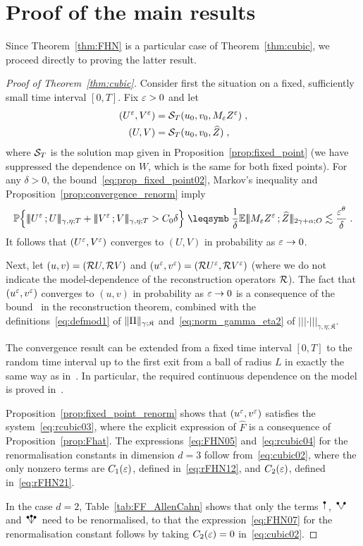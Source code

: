 \documentclass[reqno,11pt]{article}
\def\normDgamma#1{|\!|\!|#1|\!|\!|}
\def\seminormff#1#2{|\!|\!|#1\,\mathord{;}\,#2|\!|\!|}
\def\fraK{\mathfrak{K}}
\def\Zhat{\widehat Z}
\begin{document}

\section{Proof of the main results}
\label{sec_proof}

Since Theorem~\ref{thm:FHN} is a particular case of Theorem~\ref{thm:cubic}, we
proceed directly to proving the latter result. 

\begin{proof}[Proof of Theorem~\ref{thm:cubic}]
Consider first the situation on a fixed, sufficiently small time interval
$[0,T]$. Fix $\varepsilon>0$ and let 
\begin{align*}
(U^\eps,V^\eps) &= \cS_T(u_0,v_0,M_\eps Z^\eps)\;, \\
(U,V) &= \cS_T(u_0,v_0,\Zhat)\;,
\end{align*}
where ${\mathcal S}_T$ is the solution map given in Proposition~\ref{prop:fixed_point}
(we have suppressed the dependence on $W$, which is the same for both
fixed points). For any $\delta>0$, the bound~\eqref{eq:prop_fixed_point02},
Markov's inequality and Proposition~\ref{prop:convergence_renorm} imply 
\[
 \Bigprob{\seminormff{U^\eps}{U}_{\gamma,\eta;T} + 
 \seminormff{V^\eps}{V}_{\gamma,\eta;T} > C_0\delta}
 \leqs \frac{1}{\delta} \E \seminormff{M_\eps Z^\eps}{\Zhat}_{2\gamma+\alpha;O}
 \lesssim \frac{\eps^\theta}{\delta}\;.
\]
It follows that $(U^\varepsilon,V^\varepsilon)$ converges to $(U,V)$ in probability as
$\varepsilon\to0$. 

Next, let $(u,v) = ({\mathcal R} U, {\mathcal R} V)$ and $(u^\varepsilon,v^\varepsilon) = ({\mathcal R} U^\varepsilon, {\mathcal R}
V^\varepsilon)$ (where we do not indicate the model-dependence of the reconstruction
operators ${\mathcal R}$). The fact that $(u^\varepsilon,v^\varepsilon)$ converges to $(u,v)$ in
probability as $\varepsilon\to0$ is a consequence of the
bound~\cite[(3.4)]{Hairer2014} in the reconstruction theorem, combined with the
definitions~\eqref{eq:defmod1} of $\norm{\Pi}_{\gamma;\fraK}$
and~\eqref{eq:norm_gamma_eta2} of $\normDgamma{\cdot}_{\gamma,\eta;\fraK}$. 

The convergence result can be extended from a fixed time interval $[0,T]$ to
the random time interval up to the first exit from a ball of radius $L$ in
exactly the same way as in~\cite[Section~7.3]{Hairer2014}. In particular, the
required continuous dependence on the model is proved
in~\cite[Cor.~7.12]{Hairer2014}. 

Proposition~\ref{prop:fixed_point_renorm} shows that $(u^\varepsilon,v^\varepsilon)$
satisfies the system~\eqref{eq:rcubic03}, where the explicit expression of
$\widehat F$ is a consequence of Proposition~\ref{prop:Fhat}. The
expressions~\eqref{eq:FHN05} and~\eqref{eq:rcubic04} for the renormalisation
constants in dimension $d=3$ follow from~\eqref{eq:cubic02}, where the
only nonzero terms are $C_1(\varepsilon)$, defined in~\eqref{eq:rFHN12}, and
$C_2(\varepsilon)$, defined in~\eqref{eq:rFHN21}. 

In the case $d=2$, Table~\ref{tab:FF_AllenCahn} shows that only the terms
$\RSI$, $\RSV$ and $\RSW$ need to be renormalised, to that the
expression~\eqref{eq:FHN07} for the renormalisation constant follows by taking
$C_2(\varepsilon)=0$ in~\eqref{eq:cubic02}. 
\end{proof}
\end{document}
